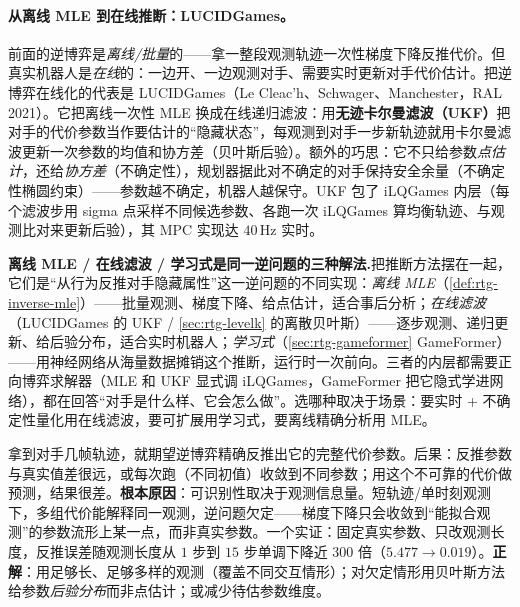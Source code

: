 \paragraph{从离线 MLE 到在线推断：LUCIDGames。}
前面的逆博弈是\emph{离线/批量}的——拿一整段观测轨迹一次性梯度下降反推代价。但真实机器人是\emph{在线}的：一边开、一边观测对手、需要实时更新对手代价估计。把逆博弈在线化的代表是 LUCIDGames（Le Cleac'h、Schwager、Manchester，RAL 2021）\cite{lecleach2021lucidgames}。它把离线一次性 MLE 换成在线递归滤波：用\textbf{无迹卡尔曼滤波（UKF）}把对手的代价参数当作要估计的“隐藏状态”，每观测到对手一步新轨迹就用卡尔曼滤波更新一次参数的均值和协方差（贝叶斯后验）。额外的巧思：它不只给参数\emph{点估计}，还给\emph{协方差}（不确定性），规划器据此对不确定的对手保持安全余量（不确定性椭圆约束）——参数越不确定，机器人越保守。UKF 包了 iLQGames 内层（每个滤波步用 sigma 点采样不同候选参数、各跑一次 iLQGames 算均衡轨迹、与观测比对来更新后验），其 MPC 实现达 $40$\,Hz 实时\cite{lecleach2021lucidgames}。

\begin{insight}
\textbf{离线 MLE / 在线滤波 / 学习式是同一逆问题的三种解法.}\;把推断方法摆在一起，它们是“从行为反推对手隐藏属性”这一逆问题的不同实现：\emph{离线 MLE}（\cref{def:rtg-inverse-mle}）——批量观测、梯度下降、给点估计，适合事后分析；\emph{在线滤波}（LUCIDGames 的 UKF / \cref{sec:rtg-levelk} 的离散贝叶斯）——逐步观测、递归更新、给后验分布，适合实时机器人；\emph{学习式}（\cref{sec:rtg-gameformer} GameFormer）——用神经网络从海量数据摊销这个推断，运行时一次前向。三者的内层都需要正向博弈求解器（MLE 和 UKF 显式调 iLQGames，GameFormer 把它隐式学进网络），都在回答“对手是什么样、它会怎么做”。选哪种取决于场景：要实时 + 不确定性量化用在线滤波，要可扩展用学习式，要离线精确分析用 MLE。
\end{insight}

\begin{pitfall}
拿到对手几帧轨迹，就期望逆博弈精确反推出它的完整代价参数。后果：反推参数与真实值差很远，或每次跑（不同初值）收敛到不同参数；用这个不可靠的代价做预测，结果很差。\textbf{根本原因}：可识别性取决于观测信息量。短轨迹/单时刻观测下，多组代价能解释同一观测，逆问题欠定——梯度下降只会收敛到“能拟合观测”的参数流形上某一点，而非真实参数。一个实证：固定真实参数、只改观测长度，反推误差随观测长度从 $1$ 步到 $15$ 步单调下降近 $300$ 倍（$5.477\to0.019$）\cite{peters2021inferring}。\textbf{正解}：用足够长、足够多样的观测（覆盖不同交互情形）；对欠定情形用贝叶斯方法给参数\emph{后验分布}而非点估计；或减少待估参数维度。
\end{pitfall}

